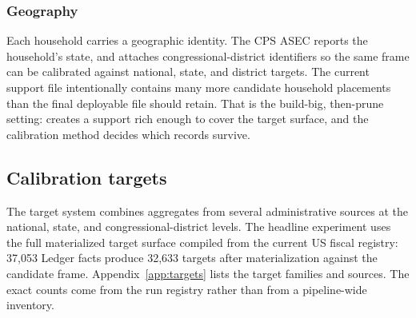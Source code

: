 \subsubsection{Geography}

Each household carries a geographic identity. The CPS ASEC reports the household's state, and
\populace{} attaches congressional-district identifiers so the same frame can be calibrated against
national, state, and district targets. The current support file intentionally contains many more
candidate household placements than the final deployable file should retain. That is the build-big,
then-prune setting: \populace{} creates a support rich enough to cover the target surface, and the
calibration method decides which records survive.

\subsection{Calibration targets}

The target system combines aggregates from several administrative sources at the national, state, and
congressional-district levels. The headline experiment uses the full materialized target surface compiled
from the current \populace{} US fiscal registry: 37{,}053 Ledger facts produce 32{,}633 targets after
materialization against the candidate frame. Appendix~\ref{app:targets} lists the target families and
sources. The exact counts come from the run registry rather than from a pipeline-wide inventory.


